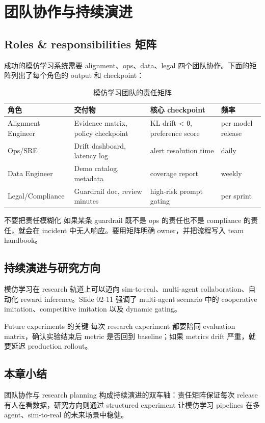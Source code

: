 \section{团队协作与持续演进}

\subsection{Roles \& responsibilities 矩阵}

成功的模仿学习系统需要 alignment、ops、data、legal 四个团队协作。下面的矩阵列出了每个角色的 output 和 checkpoint：

\begin{table}[H]
\centering
\begin{tabular}{p{} p{} p{} p{}}
\toprule
角色 & 交付物 & 核心 checkpoint & 频率 \\
\midrule
Alignment Engineer & Evidence matrix, policy checkpoint & KL drift < θ, preference score & per model release \\
Ops/SRE & Drift dashboard, latency log & alert resolution time & daily \\
Data Engineer & Demo catalog, metadata & coverage report & weekly \\
Legal/Compliance & Guardrail doc, review minutes & high-risk prompt gating & per sprint \\
\bottomrule
\end{tabular}
\caption{模仿学习团队的责任矩阵}
\end{table}

\begin{warningbox}{不要把责任模糊化}
如果某条 guardrail 既不是 ops 的责任也不是 compliance 的责任，就会在 incident 中无人响应。要用矩阵明确 owner，并把流程写入 team handbook。
\end{warningbox}

\subsection{持续演进与研究方向}

模仿学习在 research 轨道上可以迈向 sim-to-real、multi-agent collaboration、自动化 reward inference。Slide 02-11 强调了 multi-agent scenario 中的 cooperative imitation、competitive imitation 以及 dynamic gating。

\begin{importantbox}{Future experiments 的关键}
每次 research experiment 都要陪同 evaluation matrix，确认实验结束后 metric 是否回到 baseline；如果 metrics drift 严重，就要延迟 production rollout。
\end{importantbox}

\subsection{本章小结}

团队协作与 research planning 构成持续演进的双车轴：责任矩阵保证每次 release 有人在看数据，研究方向则通过 structured experiment 让模仿学习 pipelines 在多 agent、sim-to-real 的未来场景中稳健。

